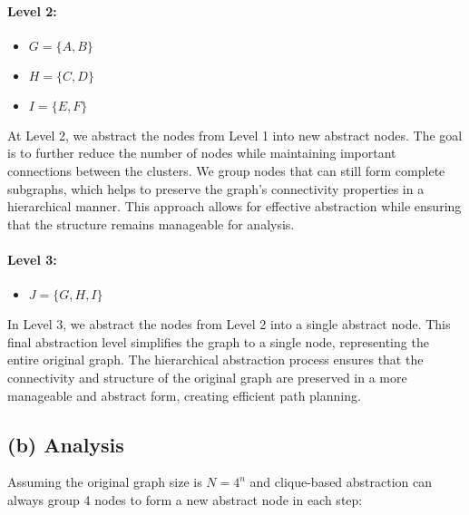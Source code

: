 \documentclass{article}
\begin{document}
\paragraph{Level 2:}
\begin{itemize}
    \item $G = \{A, B\}$
    \item $H = \{C, D\}$
    \item $I = \{E, F\}$
\end{itemize}
At Level 2, we abstract the nodes from Level 1 into new abstract nodes. The goal is to further reduce the number of nodes while maintaining important connections between the clusters. We group nodes that can still form complete subgraphs, which helps to preserve the graph's connectivity properties in a hierarchical manner. This approach allows for effective abstraction while ensuring that the structure remains manageable for analysis.

\paragraph{Level 3:}
\begin{itemize}
    \item $J = \{G, H, I\}$
\end{itemize}
In Level 3, we abstract the nodes from Level 2 into a single abstract node. This final abstraction level simplifies the graph to a single node, representing the entire original graph. The hierarchical abstraction process ensures that the connectivity and structure of the original graph are preserved in a more manageable and abstract form, creating efficient path planning.

\subsection*{(b) Analysis}
Assuming the original graph size is $N = 4^n$ and clique-based abstraction can always group 4 nodes to form a new abstract node in each step:
\end{document}
